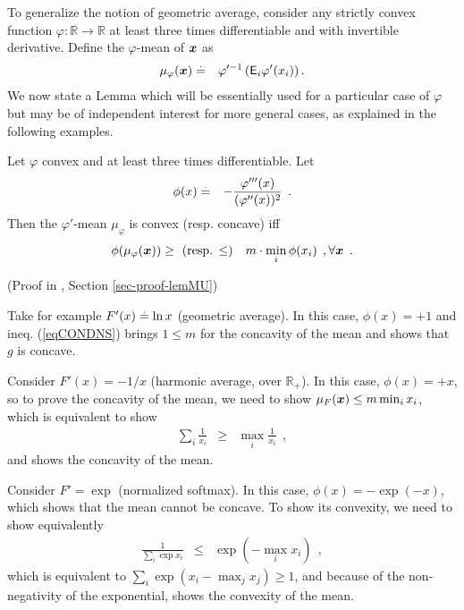 To generalize the notion of geometric average, consider any strictly convex function
$\varphi : \mathbb{R} \rightarrow \mathbb{R}$ at least three times
differentiable and with invertible derivative. Define the
$\varphi$-mean of $\bm{x}$ as
\begin{eqnarray}
\mu_{\varphi}(\bm{x}) & \stackrel{\mathrm{.}}{=} & \varphi'^{-1}\left(\mathsf{E}_i \varphi'(x_i)\right).
\end{eqnarray}
We now state a Lemma which will be essentially used for a particular
case of $\varphi$ but may be of independent interest for more general
cases, as explained in the following examples.
\begin{lemma}\label{lemMU}
Let $\varphi$ convex and at least three times differentiable. Let
\begin{eqnarray}
\phi(x) & \stackrel{\mathrm{.}}{=} & -\frac{\varphi'''(x)}{(\varphi''(x))^2}\:\:.
\end{eqnarray}
Then the $\varphi'$-mean $\mu_\varphi$ is convex (resp. concave) iff
\begin{eqnarray}
\phi(\mu_\varphi(\bm{x}))& \geq \mbox{ (resp. $\leq$)}& m \cdot \min_i
\phi(x_i) \:\:, \forall \bm{x}\:\:. \label{eqCONDNS}
\end{eqnarray}
\end{lemma}
(Proof in \SM, Section \ref{sec-proof-lemMU})
\begin{example}\label{exGEOM}
Take for example $F'(x) \stackrel{\mathrm{.}}{=} \ln x$ (geometric average). In this
case, $\phi(x) = +1$ and ineq. (\ref{eqCONDNS}) brings $1 \leq m$ for
the concavity of the mean and shows that $g$ is concave.
\end{example}
\begin{example}
Consider $F'(x) = -1/x$ (harmonic
average, over $\mathbb{R}_+$). In this case, $\phi(x) = + x$, so to prove the concavity of
the mean, we need to show $\mu_F(\bm{x}) \leq m \min_i x_i$, which is
equivalent to show
\begin{eqnarray}
\sum_i \frac{1}{x_i} & \geq & \max_i \frac{1}{x_i}\:\:,
\end{eqnarray}
and shows the concavity of the mean.
\end{example}
\begin{example}
Consider $F' = \exp$ (normalized
softmax). In this case, $\phi(x) = -\exp(-x)$, which shows that the
mean cannot be concave. To show its convexity, we need to show
equivalently
\begin{eqnarray}
\frac{1}{\sum_i \exp x_i} & \leq & \exp( - \max_i x_i)\:\:,
\end{eqnarray}
which is equivalent to $\sum_i \exp(x_i - \max_j x_j) \geq 1$, and
because of the non-negativity of the exponential,
shows the convexity of the mean.
\end{example}


